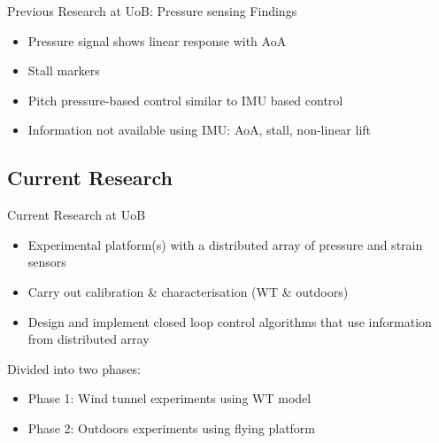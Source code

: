 \documentclass[aspectratio=169]{beamer}            %
\begin{document}
\begin{frame}{Previous Research at UoB: Pressure sensing}
  Findings
	\pause
    \begin{itemize}[<+->]
      \item Pressure signal shows linear response with AoA
      \item Stall markers
      \item Pitch pressure-based control similar to IMU based control
			\item Information not available using IMU: AoA, stall, non-linear lift
    \end{itemize}
\end{frame}

\subsection[Current Research]{Current Research}

\begin{frame}{Current Research at UoB}

  \pause
	\begin{itemize}[<+->]
    \item Experimental platform(s) with a distributed array of pressure and strain sensors
    \item Carry out calibration \& characterisation (WT \& outdoors)
    \item Design and implement closed loop control algorithms that use information from distributed array
  \end{itemize}
	\pause
  Divided into two phases:
	\pause
  \begin{itemize}[<+->]
    \item Phase 1: Wind tunnel experiments using WT model
    \item Phase 2: Outdoors experiments using flying platform
  \end{itemize}
  
\end{frame}
\end{document}
